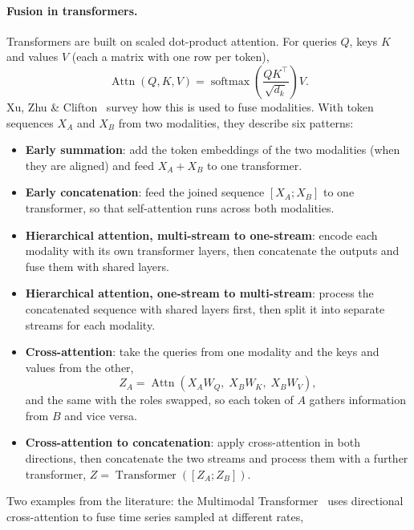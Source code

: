 \paragraph{Fusion in transformers.} Transformers are built on scaled dot-product
attention. For queries $Q$, keys $K$ and values $V$ (each a matrix with one row
per token),
\begin{equation}
  \operatorname{Attn}(Q, K, V) = \operatorname{softmax}\left(\frac{Q K^\top}{\sqrt{d_k}}\right) V.
\end{equation}
Xu, Zhu \& Clifton~\cite{xu2023multimodal} survey how this is used to fuse
modalities. With token sequences $X_A$ and $X_B$ from two modalities, they describe six
patterns:
\begin{itemize}
  \item \textbf{Early summation}: add the token embeddings of the two modalities
        (when they are aligned) and feed $X_A + X_B$ to one transformer.
  \item \textbf{Early concatenation}: feed the joined sequence $[X_A; X_B]$ to one
        transformer, so that self-attention runs across both modalities.
  \item \textbf{Hierarchical attention, multi-stream to one-stream}: encode each
        modality with its own transformer layers, then concatenate the outputs
        and fuse them with shared layers.
  \item \textbf{Hierarchical attention, one-stream to multi-stream}: process the
        concatenated sequence with shared layers first, then split it into
        separate streams for each modality.
  \item \textbf{Cross-attention}: take the queries from one modality and the keys
        and values from the other,
        \begin{equation}
          Z_A = \operatorname{Attn}\left(X_A W_Q,\; X_B W_K,\; X_B W_V\right),
        \end{equation}
        and the same with the roles swapped, so each token of $A$ gathers
        information from $B$ and vice versa.
  \item \textbf{Cross-attention to concatenation}: apply cross-attention in both
        directions, then concatenate the two streams and process them with a
        further transformer, $Z = \operatorname{Transformer}\left([Z_A; Z_B]\right)$.
\end{itemize}
Two examples from the literature: the Multimodal Transformer~\cite{tsai2019multimodal}
uses directional cross-attention to fuse time series sampled at different rates,
